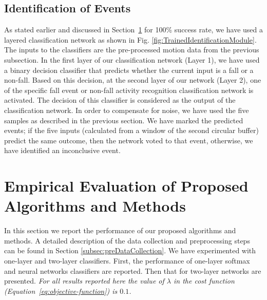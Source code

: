\documentclass[]{IEEEtran}
\begin{document}
\subsection{Identification of Events}

As stated earlier and discussed in Section~\ref{Evaluation} for 100\% success rate, we have used a layered classification network as 
shown in Fig. \ref{fig:TrainedIdentificationModule}. The inputs to the classifiers are 
the 
pre-processed motion data from the previous subsection. In the first layer of our 
classification network (Layer 1), we have used a binary decision classifier that predicts 
whether the current input is a fall or a non-fall. Based on this decision, at the second 
layer of our network (Layer 2), one of the specific fall event or non-fall activity 
recognition classification network is activated. The decision of this classifier is 
considered as the output of the classification network. In order to compensate for noise, 
we have used the five samples as described in the previous section. We have marked the 
predicted events; if the five inputs (calculated from a window of the second circular 
buffer) 
predict the same outcome, then the network voted 
to that event, otherwise, we have identified an inconclusive event. 



\section{Empirical Evaluation of Proposed Algorithms and Methods}
\label{Evaluation}

In this section we report the performance of our proposed algorithms and methods. A detailed description of the data collection and preprocessing steps can be found in Section \ref{subsec:preDataCollection}.
We have experimented with one-layer and two-layer classifiers.  First, the performance of one-layer softmax and neural networks classifiers are reported. Then that for two-layer networks are presented. 
\emph{For all results reported here the value of $\lambda$ in the cost function 
(Equation~\ref{eq:objective-function}) is $0.1$.}
\end{document}
